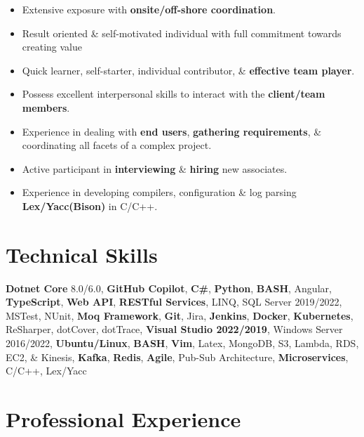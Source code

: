 \documentclass[letterpaper,9pt]{article}
\begin{document}
\begin{itemize}[itemsep=0.5em]
    \item Extensive exposure with \textbf{\color{black}onsite/off-shore coordination}.
    \item Result oriented \& self-motivated individual with full commitment towards creating value
    \item Quick learner, self-starter, individual contributor, \& \textbf{\color{black}effective team player}.
    \item Possess excellent interpersonal skills to interact with the \textbf{\color{black}client/team members}.
    \item Experience in dealing with \textbf{\color{black}end users}, \textbf{\color{black}gathering requirements}, \& coordinating all facets of a complex project.
    \item Active participant in \textbf{\color{black}interviewing} \& \textbf{\color{black}hiring} new associates.
    \item Experience in developing compilers, configuration \& log parsing \textbf{\color{black}Lex/Yacc(Bison)} in C/C++.
\end{itemize}

\section{Technical Skills}
\textbf{\color{black}Dotnet Core} 8.0/6.0, \textbf{\color{black}GitHub Copilot}, \textbf{\color{black}C\#}, \textbf{\color{black}Python}, \textbf{\color{black}BASH}, Angular, \textbf{\color{black}TypeScript}, \textbf{\color{black}Web API}, \textbf{\color{black}RESTful Services}, LINQ, SQL Server 2019/2022, MSTest, NUnit, \textbf{\color{black}Moq Framework}, \textbf{\color{black}Git}, Jira, \textbf{\color{black}Jenkins}, \textbf{\color{black}Docker}, \textbf{\color{black}Kubernetes}, ReSharper, dotCover, dotTrace, \textbf{\color{black}Visual Studio 2022/2019}, Windows Server 2016/2022, \textbf{\color{black}Ubuntu/Linux}, \textbf{\color{black}BASH}, \textbf{\color{black}Vim}, Latex, MongoDB, S3, Lambda, RDS, EC2, \& Kinesis, \textbf{\color{black}Kafka}, \textbf{\color{black}Redis}, \textbf{\color{black}Agile}, Pub-Sub Architecture, \textbf{\color{black}Microservices}, C/C++, Lex/Yacc

\pagebreak

\section{Professional Experience}

\end{document}
